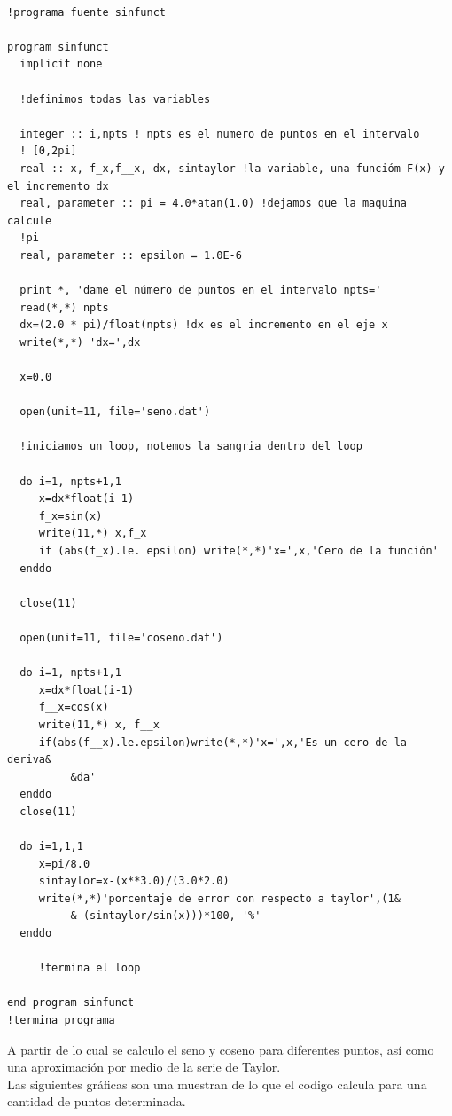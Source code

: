 \documentclass[12pt,a4paper,openright]{article}
\begin{document}
\begin{verbatim}

!programa fuente sinfunct

program sinfunct
  implicit none

  !definimos todas las variables
  
  integer :: i,npts ! npts es el numero de puntos en el intervalo
  ! [0,2pi]
  real :: x, f_x,f__x, dx, sintaylor !la variable, una funcióm F(x) y el incremento dx
  real, parameter :: pi = 4.0*atan(1.0) !dejamos que la maquina calcule
  !pi
  real, parameter :: epsilon = 1.0E-6
  
  print *, 'dame el número de puntos en el intervalo npts='
  read(*,*) npts
  dx=(2.0 * pi)/float(npts) !dx es el incremento en el eje x
  write(*,*) 'dx=',dx
  
  x=0.0
  
  open(unit=11, file='seno.dat')
  
  !iniciamos un loop, notemos la sangria dentro del loop
  
  do i=1, npts+1,1
     x=dx*float(i-1)
     f_x=sin(x)
     write(11,*) x,f_x
     if (abs(f_x).le. epsilon) write(*,*)'x=',x,'Cero de la función'
  enddo

  close(11)

  open(unit=11, file='coseno.dat')

  do i=1, npts+1,1
     x=dx*float(i-1)
     f__x=cos(x)
     write(11,*) x, f__x
     if(abs(f__x).le.epsilon)write(*,*)'x=',x,'Es un cero de la deriva&
          &da'
  enddo
  close(11)

  do i=1,1,1
     x=pi/8.0
     sintaylor=x-(x**3.0)/(3.0*2.0)
     write(*,*)'porcentaje de error con respecto a taylor',(1&
          &-(sintaylor/sin(x)))*100, '%'
  enddo
  
     !termina el loop

end program sinfunct
!termina programa

\end{verbatim}

A partir de lo cual se calculo el seno y coseno para diferentes puntos, así como una aproximación por medio de la serie de Taylor.  \\
Las siguientes gráficas son una muestran de lo que el codigo calcula para una cantidad de puntos determinada.   \\ \\ 
\end{document}
